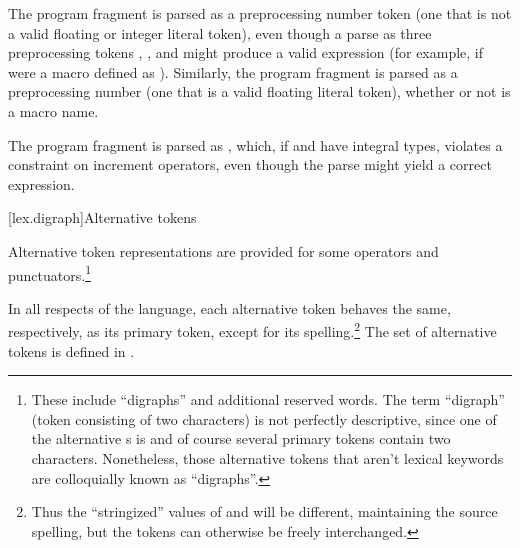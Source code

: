 \pnum
\begin{example} The program fragment  is parsed as a
preprocessing number token (one that is not a valid floating or integer
literal token), even though a parse as three preprocessing tokens
, \tcode{+}, and  might produce a valid expression (for example,
if  were a macro defined as ). Similarly, the
program fragment  is parsed as a preprocessing number (one
that is a valid floating literal token), whether or not  is a
macro name. \end{example}

\pnum
\begin{example} The program fragment  is parsed as , which, if  and  have integral types,
violates a constraint on increment operators, even though the parse
 might yield a correct expression. \end{example}%

[lex.digraph]{Alternative tokens}

\pnum
{}%
Alternative token representations are provided for some operators and
punctuators.\footnote{%
These include ``digraphs'' and additional reserved words. The term
``digraph'' (token consisting of two characters) is not perfectly
descriptive, since one of the alternative s is
\tcode{\%:\%:} and of course several primary tokens contain two
characters. Nonetheless, those alternative tokens that aren't lexical
keywords are colloquially known as ``digraphs''. }

\pnum
In all respects of the language, each alternative token behaves the
same, respectively, as its primary token, except for its spelling.\footnote{Thus the ``stringized'' values of
\tcode{[} and \tcode{<:} will be different, maintaining the source
spelling, but the tokens can otherwise be freely interchanged. }
The set of alternative tokens is defined in
.

